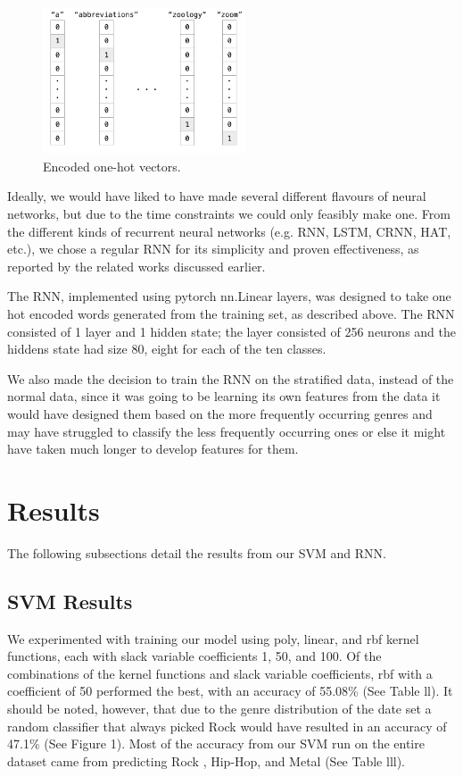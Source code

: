\documentclass[journal]{IEEEtran}
\begin{document}
\begin{figure}[h!]
\centering
\includegraphics[width=6cm]{Figure_7}
\caption{Encoded one-hot vectors.}
\end{figure}

Ideally, we would have liked to have made several different flavours of neural networks, but due to the time constraints we could only feasibly make one. From the different kinds of recurrent neural networks (e.g. RNN, LSTM, CRNN, HAT, etc.), we chose a regular RNN for its simplicity and proven effectiveness, as reported by the related works discussed earlier.

The RNN, implemented using pytorch nn.Linear layers, was designed to take one hot encoded words generated from the training set, as described above. The RNN consisted of 1 layer and 1 hidden state; the layer consisted of 256 neurons and the hiddens state had size 80, eight for each of the ten classes.

We also made the decision to train the RNN on the stratified data, instead of the normal data,  since it was going to be learning its own features from the data it would have designed them based on the more frequently occurring genres and may have struggled to classify the less frequently occurring ones or else it might have taken much longer to develop features for them. 
 
\newpage

\section{Results}

The following subsections detail the results from our SVM and RNN.

\subsection{SVM Results}

We experimented with training our model using poly, linear, and rbf kernel functions, each with slack variable coefficients 1, 50, and 100. Of the combinations of the  kernel functions and slack variable coefficients, rbf with a coefficient of 50 performed the best, with an accuracy of 55.08\% (See Table ll). It should be noted, however, that due to the genre distribution of the date set a random classifier that always picked Rock would have resulted in an accuracy of 47.1\% (See Figure 1). Most of the accuracy from our SVM run on the entire dataset came from predicting Rock , Hip-Hop, and Metal (See Table lll).
\end{document}
